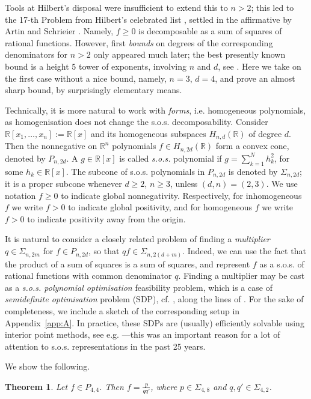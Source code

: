 \documentclass[a4paper,twoside,reqno]{amsart}
\newcommand{\RR}{\mathbb{R}}
\newcommand{\HF}[3]{H_{{#2},{#1}}({#3})}
\newcommand{\PHF}[2]{P_{{#2},{#1}}}
\newcommand{\SosHF}[2]{\Sigma_{{#2},{#1}}}
\theoremstyle{plain}
\newtheorem{thm}[prop]{Theorem}
\theoremstyle{definition}
\theoremstyle{remark}
\begin{document}
Tools at Hilbert's disposal were insufficient to
extend this to $n>2$; this led to the 17-th Problem from Hilbert's celebrated
list \cite{Hilb-probs}, 
settled in the affirmative by Artin and Schrieier
\cite{MR3069468}. Namely, $f\geq 0$ is decomposable
as a sum of squares of rational functions. However, first \emph{bounds} on degrees of the corresponding
denominators for $n>2$ only appeared much later; the best presently known bound is a height $5$ tower of exponents,
involving $n$ and $d$, see \cite{MR4071235}.
Here we take on the first case without a nice bound, namely, $n=3$, $d=4$, and prove
an almost sharp bound, by surprisingly elementary means. 

Technically, it is more natural to work with \emph{forms}, i.e. homogeneous polynomials,
as homogenisation does not change the s.o.s. decomposability.
Consider $\RR[x_1,\dots,x_n]:=\RR[x]$ and its homogeneous subspaces $\HF{d}{n}{\RR}$
of degree $d$. Then the nonnegative on $\RR^{n}$ polynomials $f\in \HF{2d}{n}{\RR}$
form a convex cone, denoted by $\PHF{2d}{n}$.
A $g\in\RR[x]$ is called \emph{s.o.s.} polynomial if $g=\sum_{k=1}^N h_k^2$, for some $h_k\in\RR[x]$.
The subcone of s.o.s. polynomials in $\PHF{2d}{n}$ is denoted by $\SosHF{2d}{n}$;
it is a proper subcone  whenever $d\geq 2$, $n\geq 3$, unless $(d,n)=(2,3)$.
We use notation $f\geq 0$ to indicate global nonnegativity. Respectively, for inhomogeneous
$f$ we write $f>0$ to indicate global positivity, and for homogeneous $f$ we write $f>0$ to
indicate positivity away from the origin.

It is natural to consider a closely
related problem of finding a \emph{multiplier} $q\in \SosHF{2m}{n}$ for $f\in\PHF{2d}{n}$, so that
$qf\in\SosHF{2(d+m)}{n}$. Indeed, we can use the fact that the product of a
sum of squares is a sum of squares, and represent $f$ as a s.o.s. of rational
functions with common denominator $q$. Finding a multiplier may be cast as a \emph{s.o.s. polynomial
optimisation} feasibility problem, which is a case of \emph{semidefinite
optimisation} problem (SDP), cf. \cite[Sect.~3.1.7]{MR3075433},
along the lines of \cite{dKP04}. For the sake of completeness, we include a sketch of the corresponding
setup in Appendix~\ref{app:A}. In practice, these SDPs are (usually)
efficiently solvable using interior point methods, see e.g.  
\cite{MR3075433,MR3469431}---this was an important reason for a lot of attention to s.o.s. representations
in the past 25 years.

We show the following.
\begin{thm}\label{thm84}
Let $f\in\PHF{4}{4}$. Then $f=\frac{p}{qq'}$, 
where $p\in\SosHF{8}{4}$ and $q,q'\in\SosHF{2}{4}$.
\end{thm}
\end{document}
